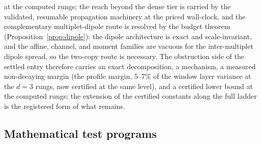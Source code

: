 at the computed rungs; the reach beyond the dense tier is carried by the validated,
resumable propagation machinery at the priced wall-clock, and the complementary
multiplet-dipole route is resolved by the budget theorem
(Proposition~\ref{prop:dipole}): the dipole architecture is exact and
scale-invariant, and the affine, channel, and moment families are vacuous
for the inter-multiplet dipole spread, so the two-copy route is necessary.
The obstruction side of
the settled entry therefore carries an exact decomposition, a mechanism, a measured
non-decaying margin (the profile margin, $5$--$7\%$ of the window layer variance at
the $d=3$ rungs, now certified at the same level), and a certified lower bound at
the computed rungs; the extension of the certified
constants along the full ladder is the registered form of what remains.

\subsection{Mathematical test programs}\label{sec:mathprograms}

